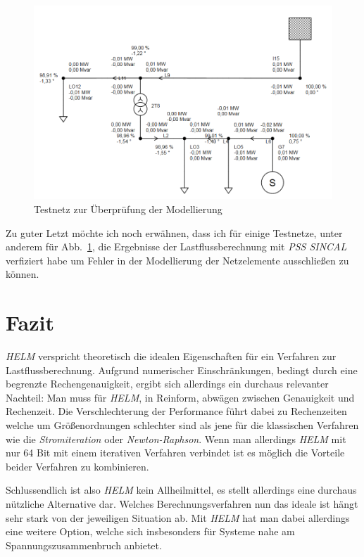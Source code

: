 \documentclass[12pt,a4paper]{article}
\newcommand{\reffig}[1]{{Abb.~\ref{#1}}}
\begin{document}
	\begin{figure}
		\centering
		\includegraphics[scale=0.55]{pictures/complete_powernet_modified}
		\caption{Testnetz zur Überprüfung der Modellierung}
		\label{fig:powernet_complete}
	\end{figure}
	
	Zu guter Letzt möchte ich noch erwähnen, dass ich für einige Testnetze, unter anderem für \reffig{fig:powernet_complete}, die Ergebnisse der Lastflussberechnung mit \emph{PSS SINCAL} verfiziert habe um Fehler in der Modellierung der Netzelemente ausschließen zu können.
	
	\section{Fazit}
	\emph{HELM} verspricht theoretisch die idealen Eigenschaften für ein Verfahren zur Lastflussberechnung. Aufgrund numerischer Einschränkungen, bedingt durch eine begrenzte Rechengenauigkeit, ergibt sich allerdings ein durchaus relevanter Nachteil: Man muss für \emph{HELM}, in Reinform, abwägen zwischen Genauigkeit und Rechenzeit. Die Verschlechterung der Performance führt dabei zu Rechenzeiten welche um Größenordnungen schlechter sind als jene für die klassischen Verfahren wie die \emph{Stromiteration} oder \emph{Newton-Raphson}. Wenn man allerdings \emph{HELM} mit nur 64 Bit mit einem iterativen Verfahren verbindet ist es möglich die Vorteile beider Verfahren zu kombinieren.
	
	Schlussendlich ist also \emph{HELM} kein Allheilmittel, es stellt allerdings eine durchaus nützliche Alternative dar. Welches Berechnungsverfahren nun das ideale ist hängt sehr stark von der jeweiligen Situation ab. Mit \emph{HELM} hat man dabei allerdings eine weitere Option, welche sich insbesonders für Systeme nahe am Spannungszusammenbruch anbietet.
	
\end{document}
